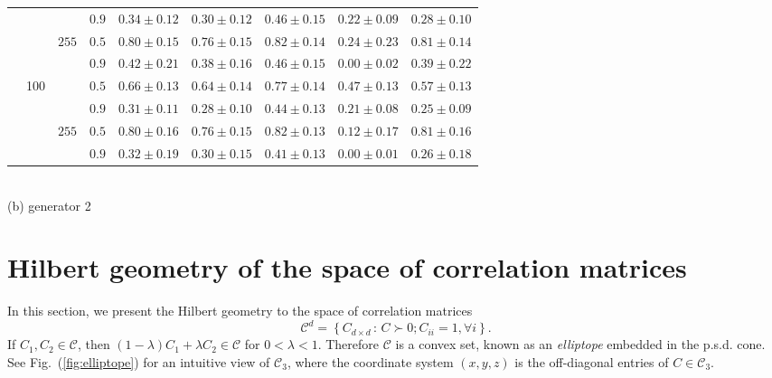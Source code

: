 \documentclass[graybox]{svmult}
\begin{document}
\begin{table}
\begin{tabular}{c|c|c|c|ccccc}
&&& $0.9$ & $0.34\pm0.12$ & $0.30\pm0.12$ & $\bm{0.46\pm0.15}$ & $0.22\pm0.09$ & $0.28\pm0.10$ \\\cline{3-9}
&& \multirow{3}{*}{$255$}
  & $0.5$ & $\bm{0.80\pm0.15}$ & $0.76\pm0.15$ & $\bm{0.82\pm0.14}$ & $0.24\pm0.23$ & $\bm{0.81\pm0.14}$ \\
&&& $0.9$ & $0.42\pm0.21$ & $0.38\pm0.16$ & $\bm{0.46\pm0.15}$ & $0.00\pm0.02$ & $0.39\pm0.22$ \\\cline{2-9}
&\multirow{6}{*}{100}
& \multirow{3}{*}{$9$}
  & $0.5$ & $0.66\pm0.13$ & $0.64\pm0.14$ & $\bm{0.77\pm0.14}$ & $0.47\pm0.13$ & $0.57\pm0.13$ \\
&&& $0.9$ & $0.31\pm0.11$ & $0.28\pm0.10$ & $\bm{0.44\pm0.13}$ & $0.21\pm0.08$ & $0.25\pm0.09$ \\\cline{3-9}
&& \multirow{3}{*}{$255$}
  & $0.5$ & $\bm{0.80\pm0.16}$ & $0.76\pm0.15$ & $\bm{0.82\pm0.13}$ & $0.12\pm0.17$ & $\bm{0.81\pm0.16}$ \\
&&& $0.9$ & $0.32\pm0.19$ & $0.30\pm0.15$ & $\bm{0.41\pm0.13}$ & $0.00\pm0.01$ & $0.26\pm0.18$ \\
\bottomrule[1.5pt]
\end{tabular}
\\(b) generator 2
\end{table}


\section{Hilbert geometry of the space of correlation matrices\label{sec:elliptope}}

In this section, we present the Hilbert geometry to the space of correlation matrices 
$$
\mathcal{C}^d = \left\{ C_{d\times{d}}\,:\,C\succ0; C_{ii}=1, \forall{i} \right\}.
$$
If $C_1,C_2\in\mathcal{C}$, then $(1-\lambda) C_1+\lambda C_2\in\mathcal{C}$ for $0<\lambda<1$.
Therefore $\mathcal{C}$ is a convex set, known as an \emph{elliptope} embedded in the p.s.d. cone.
See Fig.~(\ref{fig:elliptope}) for an intuitive view of $\mathcal{C}_3$,
where the coordinate system $(x,y,z)$ is the off-diagonal entries of $C\in\mathcal{C}_3$.
\end{document}
